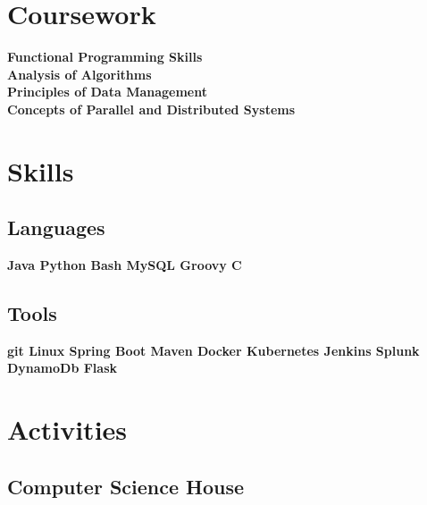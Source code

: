 \documentclass[]{deedy-resume-openfont}
\begin{document}
\begin{minipage}[t]{0.30\textwidth}

\section{Coursework}
\textbf{
  Functional Programming Skills \\
  Analysis of Algorithms \\
  Principles of Data Management \\
  Concepts of Parallel and Distributed Systems
}


\section{Skills}
\subsection{Languages}
\textbf{Java \textbullet{} Python \textbullet{} Bash \textbullet{} MySQL
Groovy \textbullet{} C \\}

\vspace{\topsep} %

\subsection{Tools}
\textbf{ git \textbullet{} Linux \textbullet{} Spring Boot \textbullet{} Maven
Docker \textbullet{} Kubernetes  \textbullet{} Jenkins
Splunk \textbullet{} DynamoDb \textbullet{} Flask}
\sectionsep


\section{Activities}

\subsection{Computer Science House}


\end{minipage}
\end{document}
